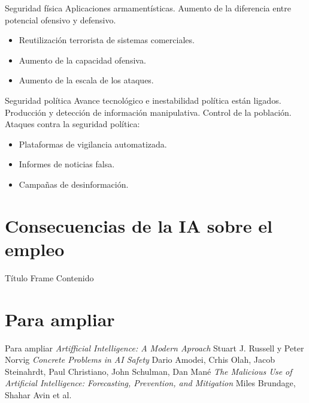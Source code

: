 \documentclass{beamer}
\begin{document}
\begin{frame}{Seguridad física}
Aplicaciones armamentísticas.
\newline
\newline
Aumento de la diferencia entre potencial ofensivo y defensivo.
\newline
\newline
\begin{itemize}
\item Reutilización terrorista de sistemas comerciales.
\item Aumento de la capacidad ofensiva.
\item Aumento de la escala de los ataques.
\end{itemize}
\end{frame}

\begin{frame}{Seguridad política}
Avance tecnológico e inestabilidad política están ligados.
\newline
\newline
Producción y detección de información manipulativa.
\newline
\newline
Control de la población.
\newline
\newline
Ataques contra la seguridad política:
\begin{itemize}
\item Plataformas de vigilancia automatizada.
\item Informes de noticias falsa.
\item Campañas de desinformación.
\end{itemize}
\end{frame}

\section{Consecuencias de la IA sobre el empleo}
\begin{frame}{Título Frame}
Contenido
\end{frame}

\section{Para ampliar}
\begin{frame}{Para ampliar}
\textit{Artifficial Intelligence: A Modern Aproach} Stuart J. Russell y Peter Norvig
\newline
\newline
\textit{Concrete Problems in AI Safety} Dario Amodei, Crhis Olah, Jacob Steinahrdt, Paul Christiano, John Schulman, Dan Mané
\newline
\newline
\textit{The Malicious Use of Artificial Intelligence: Forecasting, Prevention, and Mitigation} Miles Brundage, Shahar Avin et al.
\end{frame}
\end{document}
